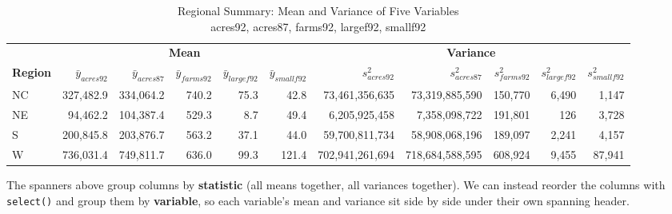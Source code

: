 \documentclass[
  letterpaper,
  DIV=11,
  numbers=noendperiod]{scrreprt}
\renewcommand{\[}{\begin{equation}}
\renewcommand{\]}{\end{equation}}
\begin{document}
\begin{table}
\caption*{
{\fontsize{20}{25}\selectfont  Regional Summary: Mean and Variance of Five Variables\fontsize{12}{15}\selectfont } \\ 
{\fontsize{14}{17}\selectfont  acres92, acres87, farms92, largef92, smallf92\fontsize{12}{15}\selectfont }
} 
\fontsize{12.0pt}{14.0pt}\selectfont
\begin{tabular*}{1\linewidth}{@{\extracolsep{\fill}}lrrrrrrrrrr}
\toprule
 & \multicolumn{5}{c}{{\textbf{Mean}}} & \multicolumn{5}{c}{{\textbf{Variance}}} \\ 
\cmidrule(lr){2-6} \cmidrule(lr){7-11}
\textbf{Region} & \(\bar{y}_{acres92}\) & \(\bar{y}_{acres87}\) & \(\bar{y}_{farms92}\) & \(\bar{y}_{largef92}\) & \(\bar{y}_{smallf92}\) & \(s^2_{acres92}\) & \(s^2_{acres87}\) & \(s^2_{farms92}\) & \(s^2_{largef92}\) & \(s^2_{smallf92}\) \\ 
\midrule\addlinespace[2.5pt]
NC & 327,482.9 & 334,064.2 & 740.2 & 75.3 & 42.8 & 73,461,356,635 & 73,319,885,590 & 150,770 & 6,490 & 1,147 \\ 
NE & 94,462.2 & 104,387.4 & 529.3 & 8.7 & 49.4 & 6,205,925,458 & 7,358,098,722 & 191,801 & 126 & 3,728 \\ 
S & 200,845.8 & 203,876.7 & 563.2 & 37.1 & 44.0 & 59,700,811,734 & 58,908,068,196 & 189,097 & 2,241 & 4,157 \\ 
W & 736,031.4 & 749,811.7 & 636.0 & 99.3 & 121.4 & 702,941,261,694 & 718,684,588,595 & 608,924 & 9,455 & 87,941 \\ 
\bottomrule
\end{tabular*}
\end{table}

The spanners above group columns by \textbf{statistic} (all means
together, all variances together). We can instead reorder the columns
with \texttt{select()} and group them by \textbf{variable}, so each
variable's mean and variance sit side by side under their own spanning
header.
\end{document}
